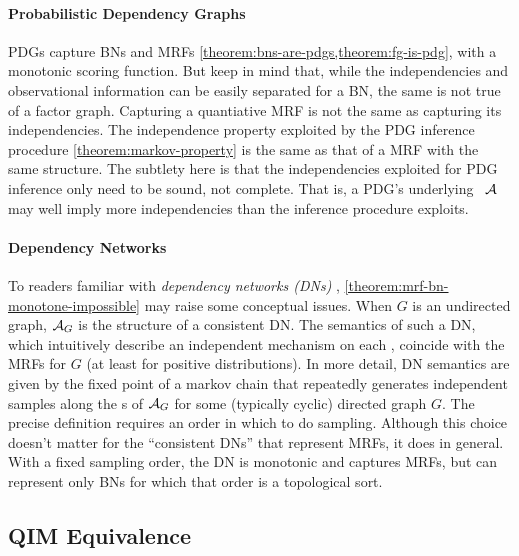\paragraph{Probabilistic Dependency Graphs}
PDGs capture BNs and MRFs
\cref{theorem:bns-are-pdgs,theorem:fg-is-pdg},
with a monotonic scoring function.
But keep in mind that, while the independencies and observational information can be easily separated for a BN, the same is not true of a factor graph.
Capturing a quantiative MRF is not the same as capturing its independencies.
The independence property exploited by the PDG inference procedure \cref{theorem:markov-property} is the same as that of a MRF with the same structure. 
The subtlety here is that the independencies exploited for PDG inference only need to be sound, not complete. 
That is, a PDG's underlying \hgraph\ $\mathcal A$ may well imply more independencies than the inference procedure exploits. 
    

\paragraph{Dependency Networks}
To readers familiar with \emph{dependency networks (DNs)} \citep{heckerman2000dependency},
\cref{theorem:mrf-bn-monotone-impossible} may raise some conceptual issues. 
When $G$ is an undirected graph, $\mathcal A_G$ is the structure of a consistent DN.
The semantics of such a DN,
which intuitively describe an independent mechanism on each \arc,
coincide with the MRFs for $G$ (at least for positive distributions). 
In more detail, DN semantics are given by the fixed point of a markov chain that repeatedly generates independent samples along the \arc s of $\mathcal A_G$ for some (typically cyclic) directed graph $G$. The precise definition requires an order in which to do sampling. Although this choice doesn't matter for the ``consistent DNs'' that represent MRFs, it does in general. With a fixed sampling order, the DN is monotonic and captures MRFs, but can represent only BNs for which that order is a topological sort.



\subsection{QIM Equivalence}
    \label{sec:equivalence}
    
